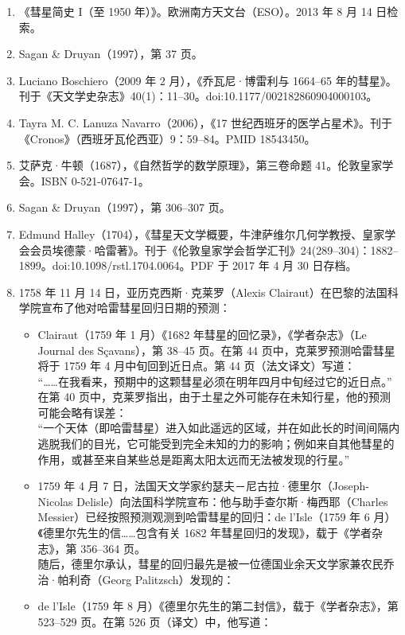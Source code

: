 \begin{enumerate}
\item 《彗星简史 I（至 1950 年）》。欧洲南方天文台（ESO）。2013 年 8 月 14 日检索。
\item Sagan & Druyan（1997），第 37 页。
\item Luciano Boschiero（2009 年 2 月），《乔瓦尼·博雷利与 1664–65 年的彗星》。刊于《天文学史杂志》40(1)：11–30。doi:10.1177/002182860904000103。
\item Tayra M. C. Lanuza Navarro（2006），《17 世纪西班牙的医学占星术》。刊于《Cronos》（西班牙瓦伦西亚）9：59–84。PMID 18543450。
\item 艾萨克·牛顿（1687），《自然哲学的数学原理》，第三卷命题 41。伦敦皇家学会。ISBN 0-521-07647-1。
\item Sagan & Druyan（1997），第 306–307 页。
\item Edmund Halley（1704），《彗星天文学概要，牛津萨维尔几何学教授、皇家学会会员埃德蒙·哈雷著》。刊于《伦敦皇家学会哲学汇刊》24(289–304)：1882–1899。doi:10.1098/rstl.1704.0064。PDF 于 2017 年 4 月 30 日存档。
\item 1758 年 11 月 14 日，亚历克西斯·克莱罗（Alexis Clairaut）在巴黎的法国科学院宣布了他对哈雷彗星回归日期的预测：
\begin{itemize}
\item Clairaut（1759 年 1 月）《1682 年彗星的回忆录》，《学者杂志》（Le Journal des Sçavans），第 38–45 页。在第 44 页中，克莱罗预测哈雷彗星将于 1759 年 4 月中旬回到近日点。第 44 页（法文译文）写道：\\
“……在我看来，预期中的这颗彗星必须在明年四月中旬经过它的近日点。”\\
在第 40 页中，克莱罗指出，由于土星之外可能存在未知行星，他的预测可能会略有误差：\\
“一个天体（即哈雷彗星）进入如此遥远的区域，并在如此长的时间间隔内逃脱我们的目光，它可能受到完全未知的力的影响；例如来自其他彗星的作用，或甚至来自某些总是距离太阳太远而无法被发现的行星。”
\item 1759 年 4 月 7 日，法国天文学家约瑟夫－尼古拉·德里尔（Joseph-Nicolas Delisle）向法国科学院宣布：他与助手查尔斯·梅西耶（Charles Messier）已经按照预测观测到哈雷彗星的回归：de l’Isle（1759 年 6 月）《德里尔先生的信……包含有关 1682 年彗星回归的发现》，载于《学者杂志》，第 356–364 页。\\
随后，德里尔承认，彗星的回归最先是被一位德国业余天文学家兼农民乔治·帕利奇（Georg Palitzsch）发现的：
\item de l’Isle（1759 年 8 月）《德里尔先生的第二封信》，载于《学者杂志》，第 523–529 页。在第 526 页（译文）中，他写道：


\end{itemize}
\end{enumerate}
